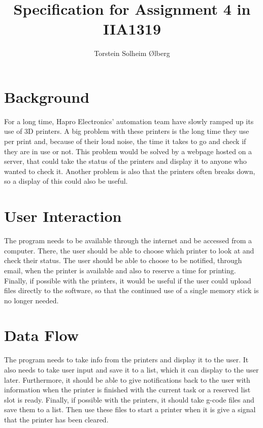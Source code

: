 \documentclass[11pt, A4paper, norsk]{article}
\author{Torstein Solheim Ølberg}
\title{Specification for Assignment 4 in IIA1319}
\begin{document}
	\maketitle
	\section{Background}
For a long time, Hapro Electronics' automation team have slowly ramped up its use of 3D printers. A big problem with these printers is the long time they use per print and, because of their loud noise, the time it takes to go and check if they are in use or not. This problem would be solved by a webpage hosted on a server, that could take the status of the printers and display it to anyone who wanted to check it. Another problem is also that the printers often breaks down, so a display of this could also be useful.
	
	\section{User Interaction}
The program needs to be available through the internet and be accessed from a computer. There, the user should be able to choose which printer to look at and check their status. The user should be able to choose to be notified, through email, when the printer is available and also to reserve a time for printing. Finally, if possible with the printers, it would be useful if the user could upload files directly to the software, so that the continued use of a single memory stick is no longer needed.
	
	\section{Data Flow}
The program needs to take info from the printers and display it to the user. It also needs to take user input and save it to a list, which it can display to the user later. Furthermore, it should be able to give notifications back to the user with information when the printer is finished with the current task or a reserved list slot is ready. Finally, if possible with the printers, it should take g-code files and save them to a list. Then use these files to start a printer when it is give a signal that the printer has been cleared.
	
\end{document}
